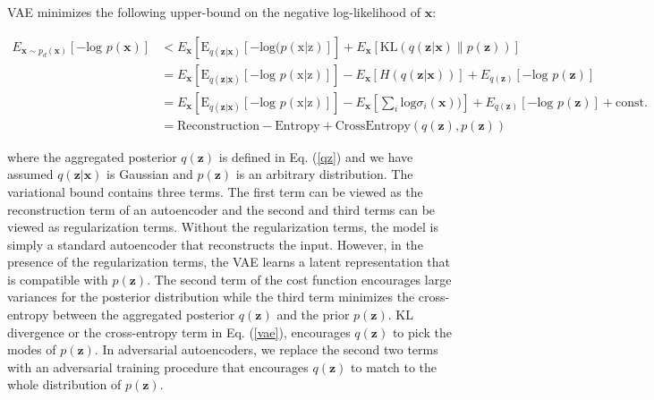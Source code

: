 \documentclass{article}
\begin{document}
VAE \citep{vae} minimizes the following upper-bound on the negative log-likelihood of $\mathbf{x}$:

\begin{equation} \label{vae}
\begin{split}
E_{\mathbf{x} \sim p_d(\mathbf{x})}[-\text{log } p(\mathbf{x})] &< E_{\mathbf{x}}[\text{E}_{q(\mathbf{z}|\mathbf{x})} [-\text{log}(p(\text{x}|\text{z})]] + E_{\mathbf{x}} [\text{KL}( q(\mathbf{z}|\mathbf{x}) \| p(\mathbf{z}) )]\\
  &=  E_{\mathbf{x}}[\text{E}_{q(\mathbf{z}|\mathbf{x})} [-\text{log }p(\text{x}|\text{z})]] - E_{\mathbf{x}}[H({q(\mathbf{z}|\mathbf{x})})] + E_{q(\mathbf{z})}[-\text{log } p(\mathbf{z})] \\
  &=  E_{\mathbf{x}}[\text{E}_{q(\mathbf{z}|\mathbf{x})} [-\text{log }p(\text{x}|\text{z})]] - E_{\mathbf{x}}[\sum_i \text{log} \sigma_i(\mathbf{x}))] + E_{q(\mathbf{z})}[-\text{log } p(\mathbf{z})] + \text{const.}\\
 &= \text{Reconstruction} - \text{Entropy} + \text{CrossEntropy}(q(\mathbf{z}),p(\mathbf{z}))
\end{split}
\end{equation}

where the aggregated posterior $q(\mathbf{z})$ is defined in Eq. (\ref{qz}) and we have assumed $q(\mathbf{z}|\mathbf{x})$ is Gaussian and $p(\mathbf{z})$ is an arbitrary distribution.
The variational bound contains three terms.
The first term can be viewed as the reconstruction term of an autoencoder and the second and third terms can be viewed as regularization terms.
Without the regularization terms, the model is simply a standard autoencoder that reconstructs the input.
However, in the presence of the regularization terms, the VAE learns a latent representation that is compatible with $p(\mathbf{z})$.
The second term of the cost function encourages large variances for the posterior distribution while the third term minimizes the cross-entropy between the aggregated posterior $q(\mathbf{z})$ and the prior $p(\mathbf{z})$. 
KL divergence or the cross-entropy term in Eq. (\ref{vae}), encourages $q(\mathbf{z})$ to pick the modes of $p(\mathbf{z})$. In adversarial autoencoders, we replace the second two terms with an adversarial training procedure that encourages $q(\mathbf{z})$ to match to the whole distribution of $p(\mathbf{z})$.
\end{document}
